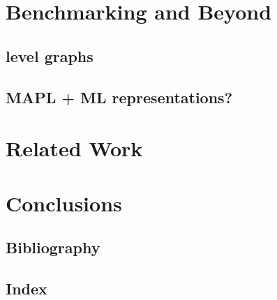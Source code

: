 \documentclass{report}
\begin{document}
\chapter{Benchmarking and Beyond}
\section{level graphs}
\section{MAPL + ML representations?}

\chapter{Related Work}


\chapter{Conclusions} 


\section*{Bibliography} 
\section*{Index} 
\end{document}

